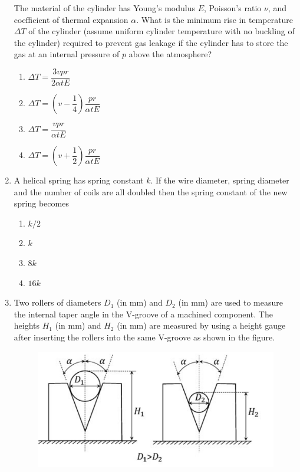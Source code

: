 \documentclass[12pt,onecolumn]{article}
\begin{document}
\begin{enumerate}
          The material of the cylinder has Young’s modulus $E$, Poisson’s ratio $\nu$, and coefficient of thermal expansion $\alpha$. What is the minimum rise in temperature $\Delta T$ of the cylinder (assume uniform cylinder temperature with no buckling of the cylinder) required to prevent gas leakage if the cylinder has to store the gas at an internal pressure of $p$ above the atmosphere?
          \begin{enumerate}
              \item $\Delta T = \dfrac{3 v p r}{2 \alpha t E}$
              \item $\Delta T = \left( v - \dfrac{1}{4} \right) \dfrac{p r}{\alpha t E}$
              \item $\Delta T = \dfrac{v p r}{\alpha t E}$
              \item $\Delta T = \left( v + \dfrac{1}{2} \right) \dfrac{p r}{\alpha t E}$
          \end{enumerate}
    \item A helical spring has spring constant $k$. If the wire diameter, spring diameter and the number of coils are all doubled then the spring constant of the new spring becomes
          \begin{enumerate}
              \item $k/2$
              \item $k$
              \item $8k$
              \item $16k$
          \end{enumerate}

    \item Two rollers of diameters $D_1$ (in mm) and $D_2$ (in mm) are used to measure the internal taper angle in the V-groove of a machined component. The heights $H_1$ (in mm) and $H_2$ (in mm) are measured by using a height gauge after inserting the rollers into the same V-groove as shown in the figure.

          \begin{figure}[H]
              \centering
              \includegraphics[scale=0.4]{q32s2}
              \label{fig:q32s2}
          \end{figure}


\end{enumerate}
\end{document}
